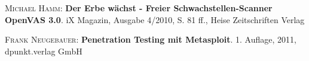 \begin{thebibliography}{---}

  \textsc{Michael Hamm}: 
  \textbf{Der Erbe wächst - Freier Schwachstellen-Scanner OpenVAS 3.0}.
  iX Magazin, Ausgabe 4/2010, S. 81 ff., Heise Zeitschriften Verlag

  \textsc{Frank Neugebauer}: 
  \textbf{Penetration Testing mit Metasploit}.
  1. Auflage, 2011, dpunkt.verlag GmbH

\end{thebibliography}

